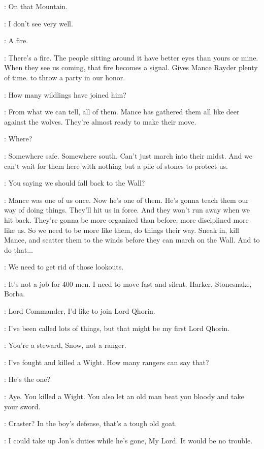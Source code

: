 \HALFHAND: On that Mountain. 

\SAM: I don't see very well. 

\JON: A fire. 

\HALFHAND: There's a fire. The people sitting around it have better eyes than yours or mine. When they see us coming, that fire becomes a signal. Gives Mance Rayder plenty of time. to throw a party in our honor. 

\JEOR: How many wildlings have joined him? 

\HALFHAND: From what we can tell, all of them. Mance has gathered them all like deer against the wolves. They're almost ready to make their move. 

\JON: Where? 

\HALFHAND: Somewhere safe. Somewhere south. Can't just march into their midst. And we can't wait for them here with nothing but a pile of stones to protect us. 

\JEOR: You saying we should fall back to the Wall? 

\HALFHAND: Mance was one of us once. Now he's one of them. He's gonna teach them our way of doing things. They'll hit us in force. And they won't run away when we hit back. They're gonna be more organized than before, more disciplined more like us. So we need to be more like them, do things their way. Sneak in, kill Mance, and scatter them to the winds before they can march on the Wall. And to do that$\ldots$ 

\JEOR: We need to get rid of those lookouts. 

\HALFHAND: It's not a job for 400 men. I need to move fast and silent. Harker, Stonesnake, Borba. 

\JON: Lord Commander, I'd like to join Lord Qhorin. 

\HALFHAND: I've been called lots of things, but that might be my first Lord Qhorin. 

\JEOR: You're a steward, Snow, not a ranger. 

\JON: I've fought and killed a Wight. How many rangers can say that? 

\HALFHAND: He's the one? 

\JEOR: Aye. You killed a Wight. You also let an old man beat you bloody and take your sword. 


\HALFHAND: Craster? In the boy's defense, that's a tough old goat. 

\SAM: I could take up Jon's duties while he's gone, My Lord. It would be no trouble. 

